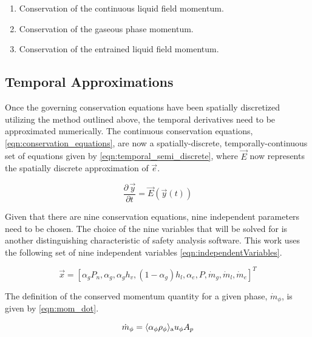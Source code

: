 \begin{enumerate}
\item{Conservation of the continuous liquid field momentum.}
\item{Conservation of the gaseous phase momentum.}
\item{Conservation of the entrained liquid field momentum.}
\end{enumerate}

\subsection{Temporal Approximations}
\label{subsect:temporal_approx}

Once the governing conservation equations have been spatially discretized utilizing the method outlined above, the temporal derivatives need to be approximated numerically.
The continuous conservation equations, \eqref{eqn:conservation_equations}, are now a spatially-discrete, temporally-continuous set of equations given by \eqref{eqn:temporal_semi_discrete}, where $\vec{E}$ now represents the spatially discrete approximation of $\vec{e}$.

\begin{equation}
\label{eqn:temporal_semi_discrete}
\frac{\partial \,\vec{y} }{\partial t} = \vec{E}(\vec{y}(t))
\end{equation}

Given that there are nine conservation equations, nine independent parameters need to be chosen.
The choice of the nine variables that will be solved for is another distinguishing characteristic of safety analysis software.
This work uses the following set of nine independent variables \eqref{eqn:independentVariables}.

\begin{equation}
\label{eqn:independentVariables}
\vec{x} = [\alpha_{g}P_{n}, \alpha_g, \alpha_g h_v, (1 - \alpha_g) h_l, \alpha_e, P, \dot{m}_g, \dot{m}_l, \dot{m}_e]^{T}
\end{equation}

The definition of the conserved momentum quantity for a given phase, $\dot{m}_{\phi}$, is given by \eqref{eqn:mom_dot}.

\begin{equation}
\label{eqn:mom_dot}
\dot{m}_{\phi} = \ave{\alpha_{\phi} \rho_{\phi}}_{\text{a}} u_{\phi} A_{p}
\end{equation}


